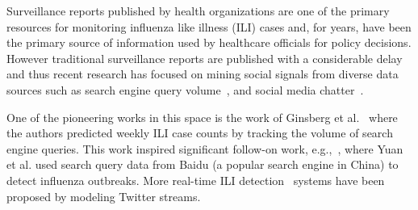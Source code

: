 Surveillance reports published by health organizations are one of the
primary resources for monitoring influenza like illness (ILI) cases and,
for years, have been the primary source of information used by healthcare
officials for policy decisions. However traditional surveillance
reports are published with a considerable delay and thus recent research
has focused on mining social signals from diverse data sources such as
search engine query volume~\cite{ref1, ref2}, and social
media chatter~\cite{ref3, ref4, ref5, ref6, ref7}.




One of the pioneering works in this 
space is the work of
Ginsberg et al.~\cite{ref2} where the authors 
predicted weekly ILI case counts
by tracking the volume of search engine queries. This work 
inspired significant follow-on work, e.g.,~\cite{ref1}, where Yuan 
et al. used search query data from Baidu (a popular search 
engine in China) to detect influenza outbreaks. 
More real-time ILI detection~\cite{ref4} systems have been proposed 
by modeling Twitter streams.

